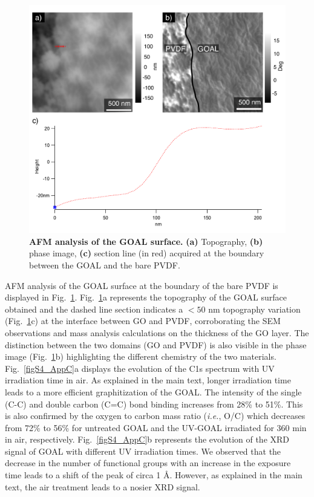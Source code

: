 \begin{figure}[h!]
  \centering
  \includegraphics[width=5in]{paper4/FigS3.pdf}
  \caption{\textbf{AFM analysis of the GOAL surface.} \textbf{(a)} Topography, \textbf{(b)} phase image, \textbf{(c)} section line (in red)
acquired at the boundary between the GOAL and the bare PVDF. } 
  \label{figS3_AppC}
\end{figure}

AFM analysis of the GOAL surface at the boundary of the bare PVDF is displayed in Fig.~\ref{figS3_AppC}. Fig.~\ref{figS3_AppC}a represents the topography of the GOAL surface obtained and the dashed line section indicates a $<50$ nm topography variation (Fig.~\ref{figS3_AppC}c) at the interface between GO and PVDF, corroborating the SEM observations and mass analysis calculations on the thickness of the GO layer. The distinction between the two domains (GO and PVDF) is also visible in the phase image (Fig.~\ref{figS3_AppC}b) highlighting the different chemistry of the two materials. Fig.~\ref{figS4_AppC}a displays the evolution of the C1s spectrum with UV irradiation time in air. As explained in the main text, longer irradiation time leads to a more efficient graphitization of the GOAL. The intensity of the single (C-C) and double carbon (C=C) bond binding increases from 28\% to 51\%. This is also confirmed by the oxygen to carbon mass ratio (\textit{i.e.}, O/C) which decreases from 72\% to 56\% for untreated GOAL and the UV-GOAL irradiated for 360 min in air, respectively. Fig.~\ref{figS4_AppC}b represents the evolution of the XRD signal of GOAL with different UV irradiation times. We observed that the decrease in the number of functional groups with an increase in the exposure time leads to a shift of the peak of circa 1 {\AA}. However, as explained in the main text, the air treatment leads to a nosier XRD signal. 

